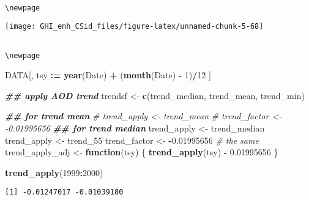 \documentclass[
  10pt,
  a4paper,oneside]{article}
\newenvironment{Shaded}{\begin{snugshade}}{\end{snugshade}}
\newcommand{\CommentTok}[1]{\textcolor[rgb]{0.56,0.35,0.01}{\textit{#1}}}
\newcommand{\ControlFlowTok}[1]{\textcolor[rgb]{0.13,0.29,0.53}{\textbf{#1}}}
\newcommand{\DecValTok}[1]{\textcolor[rgb]{0.00,0.00,0.81}{#1}}
\newcommand{\DocumentationTok}[1]{\textcolor[rgb]{0.56,0.35,0.01}{\textbf{\textit{#1}}}}
\newcommand{\FloatTok}[1]{\textcolor[rgb]{0.00,0.00,0.81}{#1}}
\newcommand{\FunctionTok}[1]{\textcolor[rgb]{0.13,0.29,0.53}{\textbf{#1}}}
\newcommand{\NormalTok}[1]{#1}
\newcommand{\OtherTok}[1]{\textcolor[rgb]{0.56,0.35,0.01}{#1}}
\newcommand{\SpecialCharTok}[1]{\textcolor[rgb]{0.81,0.36,0.00}{\textbf{#1}}}
\begin{document}
\begin{verbatim}

\newpage
\end{verbatim}

\begin{center}\texttt{[image: GHI\_enh\_CSid\_files/figure-latex/unnamed-chunk-5-68]} \end{center}

\begin{verbatim}

\newpage
\end{verbatim}

\begin{Shaded}
\begin{Highlighting}[]
\NormalTok{DATA[, tsy }\SpecialCharTok{:=} \FunctionTok{year}\NormalTok{(Date) }\SpecialCharTok{+}\NormalTok{ (}\FunctionTok{month}\NormalTok{(Date) }\SpecialCharTok{{-}} \DecValTok{1}\NormalTok{)}\SpecialCharTok{/}\DecValTok{12}\NormalTok{ ]}


\DocumentationTok{\#\# apply AOD trend}
\NormalTok{trendsf }\OtherTok{\textless{}{-}} \FunctionTok{c}\NormalTok{(trend\_median, trend\_mean, trend\_min)}




\DocumentationTok{\#\# for trend mean}
\CommentTok{\# trend\_apply  \textless{}{-} trend\_mean}
\CommentTok{\# trend\_factor \textless{}{-} {-}0.01995656}
\DocumentationTok{\#\# for trend median}
\NormalTok{trend\_apply  }\OtherTok{\textless{}{-}}\NormalTok{ trend\_median}
\NormalTok{trend\_apply  }\OtherTok{\textless{}{-}}\NormalTok{ trend\_55}
\NormalTok{trend\_factor }\OtherTok{\textless{}{-}} \SpecialCharTok{{-}}\FloatTok{0.01995656}  \CommentTok{\# the same}
\NormalTok{trend\_apply\_adj }\OtherTok{\textless{}{-}} \ControlFlowTok{function}\NormalTok{(tsy) \{}
  \FunctionTok{trend\_apply}\NormalTok{(tsy) }\SpecialCharTok{{-}} \FloatTok{0.01995656}
\NormalTok{\}}

\FunctionTok{trend\_apply}\NormalTok{(}\DecValTok{1999}\SpecialCharTok{:}\DecValTok{2000}\NormalTok{)}
\end{Highlighting}
\end{Shaded}

\begin{verbatim}
[1] -0.01247017 -0.01039180
\end{verbatim}

\begin{Shaded}
\end{Shaded}
\end{document}
